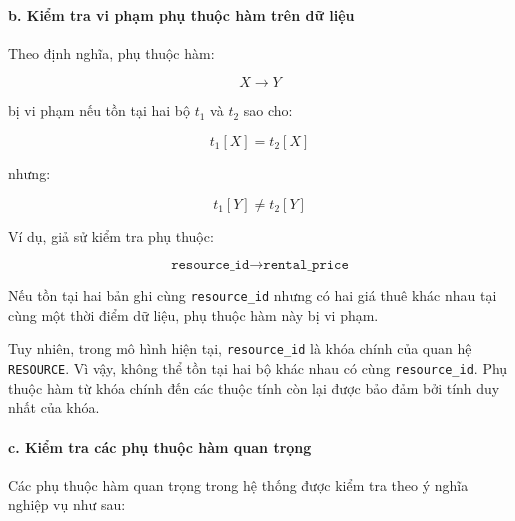 \paragraph{b. Kiểm tra vi phạm phụ thuộc hàm trên dữ liệu}\mbox{}\par

Theo định nghĩa, phụ thuộc hàm:

$$X \rightarrow Y$$

bị vi phạm nếu tồn tại hai bộ $t_1$ và $t_2$ sao cho:

$$t_1[X] = t_2[X]$$

nhưng:

$$t_1[Y] \neq t_2[Y]$$

Ví dụ, giả sử kiểm tra phụ thuộc:

$$\texttt{resource\_id} \rightarrow \texttt{rental\_price}$$

Nếu tồn tại hai bản ghi cùng \texttt{resource\_id} nhưng có hai giá thuê khác nhau tại cùng một thời điểm dữ liệu, phụ thuộc hàm này bị vi phạm.

Tuy nhiên, trong mô hình hiện tại, \texttt{resource\_id} là khóa chính của quan hệ \texttt{RESOURCE}. Vì vậy, không thể tồn tại hai bộ khác nhau có cùng \texttt{resource\_id}. Phụ thuộc hàm từ khóa chính đến các thuộc tính còn lại được bảo đảm bởi tính duy nhất của khóa.

\paragraph{c. Kiểm tra các phụ thuộc hàm quan trọng}\mbox{}\par

Các phụ thuộc hàm quan trọng trong hệ thống được kiểm tra theo ý nghĩa nghiệp vụ như sau:

